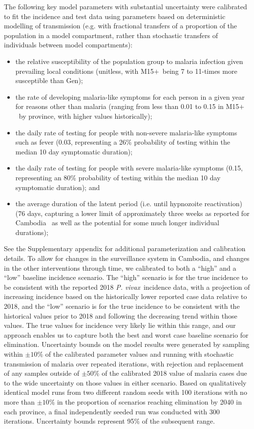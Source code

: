 \documentclass[doublespacing]{bmcart}
\newcommand{\pv}{\textit{P. vivax}}
\newcommand{\males}{M15$+$}
\newcommand{\gen}{Gen}
\begin{document}
The following key model parameters with substantial uncertainty were calibrated to fit the incidence and test data using parameters based on deterministic modelling of transmission (e.g. with fractional transfers of a proportion of the population in a model compartment, rather than stochastic transfers of individuals between model compartments): \begin{itemize}
\item the relative susceptibility of the population group to malaria infection given prevailing local conditions (unitless, with \males~being 7 to 11-times more susceptible than \gen); 
\item the rate of developing malaria-like symptoms for each person in a given year for reasons other than malaria (ranging from less than 0.01 to 0.15 in \males~by province, with higher values historically); 
\item the daily rate of testing for people with non-severe malaria-like symptoms such as fever (0.03, representing a 26\% probability of testing within the median 10 day symptomatic duration); 
\item the daily rate of testing for people with severe malaria-like symptoms (0.15, representing an 80\% probability of testing within the median 10 day symptomatic duration); and 
\item the average duration of the latent period (i.e. until hypnozoite reactivation) (76 days, capturing a lower limit of approximately three weeks as reported for Cambodia \cite{white2011determinants}~as well as the potential for some much longer individual durations);
\end{itemize} See the Supplementary appendix for additional parameterization and calibration details. To allow for changes in the surveillance system in Cambodia, and changes in the other interventions through time, we calibrated to both a ``high'' and a ``low'' baseline incidence scenario. The ``high'' scenario is for the true incidence to be consistent with the reported 2018 \pv~incidence data, with a projection of increasing incidence based on the historically lower reported case data relative to 2018, and the ``low'' scenario is for the true incidence to be consistent with the historical values prior to 2018 and following the decreasing trend within those values. The true values for incidence very likely lie within this range, and our approach enables us to capture both the best and worst case baseline scenario for elimination. Uncertainty bounds on the model results were generated by sampling within $\pm10\%$ of the calibrated parameter values and running with stochastic transmission of malaria over repeated iterations, with rejection and replacement of any samples outside of $\pm50\%$ of the calibrated 2018 value of malaria cases due to the wide uncertainty on those values in either scenario. Based on qualitatively identical model runs from two different random seeds with 100 iterations with no more than $\pm10\%$ in the proportion of scenarios reaching elimination by 2040 in each province, a final independently seeded run was conducted with 300 iterations. Uncertainty bounds represent 95\% of the subsequent range.
\end{document}
